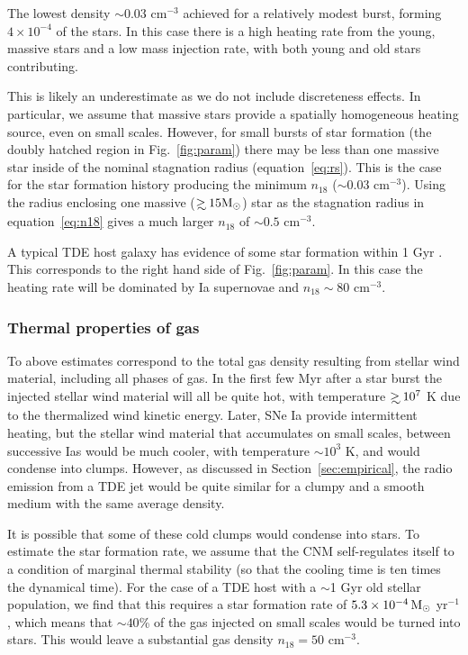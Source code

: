 \documentclass[usenatbib,fleqn]{mnras}
\newcommand\gsim{\mathrel{\rlap{\lower4pt\hbox{\hskip1pt$\sim$}}
    \raise1pt\hbox{$>$}}}
\newcommand{\Msun}{{\rm M_\odot}}
\begin{document}
The lowest density $\sim 0.03$ cm$^{-3}$ achieved for a relatively
modest burst, forming $4\times 10^{-4}$ of the stars. In this case
there is a high heating rate from the young, massive stars and a low mass
injection rate, with both young and old stars contributing.

This is likely an underestimate as we do not include discreteness
effects. In particular, we assume that massive stars provide a
spatially homogeneous heating source, even on small scales. However,
for small bursts of star formation (the doubly hatched region in
Fig.~\ref{fig:param}) there may be less than one massive star inside
of the nominal stagnation radius (equation~\ref{eq:rs}). This is the
case for the star formation history producing the minimum $n_{18}$
($\sim 0.03$ cm$^{-3}$). Using the radius enclosing one massive
($\gsim 15 \Msun$) star as the stagnation radius in
equation~\eqref{eq:n18} gives a much larger $n_{18}$ of $\sim 0.5$
cm$^{-3}$.

A typical TDE host galaxy has evidence of some star formation
within 1 Gyr \citep{French+2016}. This corresponds to the right hand side
of Fig.~\ref{fig:param}. In this case the heating rate will be
dominated by Ia supernovae and $n_{18}\sim 80$ cm$^{-3}$.

\subsubsection{Thermal properties of gas}

To above estimates correspond to the total gas density resulting from
stellar wind material, including all phases of gas. In the first few
Myr after a star burst the injected stellar wind material will all be
quite hot, with temperature $\gsim 10^{7}$ K due to the thermalized
wind kinetic energy. Later, SNe Ia provide intermittent heating, but
the stellar wind material that accumulates on small scales, between
successive Ias would be much cooler, with temperature $\sim 10^{3}$ K,
and would condense into clumps. However, as discussed in
Section~\ref{sec:empirical}, the radio emission from a TDE jet would
be quite similar for a clumpy and a smooth medium with the same
average density.



It is possible that some of these cold clumps would condense into
stars. To estimate the star formation rate, we assume that the CNM
self-regulates itself to a condition of marginal thermal stability (so
that the cooling time is ten times the dynamical time). For the case
of a TDE host with a $\sim$1 Gyr old stellar population, we find that
this requires a star formation rate of  $5.3 \times 10^{-4}
\,\Msun$ yr$^{-1}$, which means that $\sim 40$\% of the gas injected
on small scales would be turned into stars. This would leave a
substantial gas density $n_{18}=50$ cm$^{-3}$.
\end{document}
